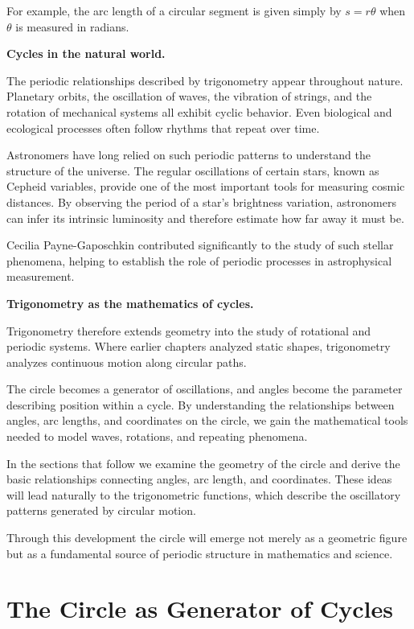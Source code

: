 \documentclass[11pt, openany]{book}
\theoremstyle{plain}
\theoremstyle{definition}
\theoremstyle{remark}
\begin{document}
For example, the arc length of a circular segment is given simply by
$s=r\theta$ when $\theta$ is measured in radians.

\medskip

\textbf{Cycles in the natural world.}

The periodic relationships described by trigonometry appear throughout
nature. Planetary orbits, the oscillation of waves, the vibration of
strings, and the rotation of mechanical systems all exhibit cyclic
behavior. Even biological and ecological processes often follow rhythms
that repeat over time.

Astronomers have long relied on such periodic patterns to understand the
structure of the universe. The regular oscillations of certain stars,
known as Cepheid variables, provide one of the most important tools for
measuring cosmic distances. By observing the period of a star's
brightness variation, astronomers can infer its intrinsic luminosity and
therefore estimate how far away it must be.

Cecilia Payne-Gaposchkin contributed significantly to the study of such
stellar phenomena, helping to establish the role of periodic processes
in astrophysical measurement.

\medskip

\textbf{Trigonometry as the mathematics of cycles.}

Trigonometry therefore extends geometry into the study of rotational and
periodic systems. Where earlier chapters analyzed static shapes,
trigonometry analyzes continuous motion along circular paths.

The circle becomes a generator of oscillations, and angles become the
parameter describing position within a cycle. By understanding the
relationships between angles, arc lengths, and coordinates on the
circle, we gain the mathematical tools needed to model waves,
rotations, and repeating phenomena.

\medskip

In the sections that follow we examine the geometry of the circle and
derive the basic relationships connecting angles, arc length, and
coordinates. These ideas will lead naturally to the trigonometric
functions, which describe the oscillatory patterns generated by circular
motion.

Through this development the circle will emerge not merely as a geometric
figure but as a fundamental source of periodic structure in mathematics
and science.

\section{The Circle as Generator of Cycles}
\end{document}

